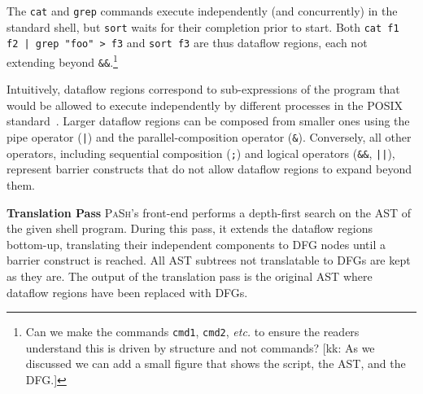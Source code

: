 \documentclass[sigplan, review, screen, anonymous]{acmart}
\newcommand{\etc}{{\em etc.}\xspace}
\newcommand{\heading}[1]{\vspace{4pt}\noindent\textbf{#1}\enspace}
\newcommand{\ttt}[1]{\texttt{#1}}
\newcommand{\kk}[1]{[{\color{magenta}kk: #1}]}
\newcommand{\tr}[1]{} %
\newcommand{\sx}[1]{(\S\ref{#1})}
\newcommand{\sys}{{\scshape PaSh}\xspace}
\begin{document}
\noindent
The \ttt{cat} and \ttt{grep} commands execute independently (and concurrently) in the standard shell, but \ttt{sort} waits for their completion prior to start.
Both \ttt{cat f1 f2 | grep "foo" > f3} and \ttt{sort f3} are thus dataflow regions, each not extending beyond \ttt{&&}.\footnote{
  Can we make the commands \ttt{cmd1}, \ttt{cmd2}, \etc to ensure the readers understand this is driven by structure and not commands? 
  \kk{As we discussed we can add a small figure that shows the script, the AST, and the DFG.}}

Intuitively, dataflow regions correspond to sub-expressions of
the program that would be allowed to execute independently by
different processes in the POSIX standard~\cite{posix}. Larger
dataflow regions can be composed from smaller ones using the
pipe operator (\ttt{|}) and the parallel-composition operator (\ttt{&}).
Conversely, all other operators, including sequential composition (\ttt{;}) and logical operators (\ttt{&&}, \ttt{||}), represent
barrier constructs that do not allow dataflow regions to expand beyond them.

% 
% 
% 

\heading{Translation Pass}
%
%
\sys's front-end performs a depth-first search on the AST of
the given shell program.  During this pass, it extends the
dataflow regions bottom-up, translating their
independent components to DFG nodes until a barrier
construct is reached. All AST subtrees not translatable to DFGs are kept as they are. The output of the translation pass is the
original AST where dataflow regions have been replaced with
DFGs. 
\end{document}
